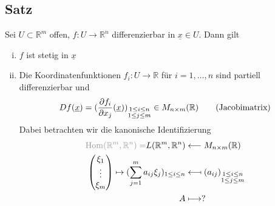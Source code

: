 \subsection[Satz: Differenzierbar impliziert stetig und partiell differenzierbare Koordinatenfunktionen]{Satz} %
\label{sub:74}
Sei $U \subset \mathds{R}^m$ offen, $f : U \to \mathds{R}^n$ differenzierbar in $\underline{x} \in U$. Dann gilt 
\begin{enumerate}[(i)]
	\item $f$ ist stetig in $\underline{x} $
	\item Die Koordinatenfunktionen $f_i : U \to \mathds{R}$ für $i= 1, \ldots , n$ sind partiell differenzierbar und 
	\[
		D f(\underline{x} ) = (\frac{\partial f_i }{\partial x_j} ( \underline{x} ) )_{\substack{1 \le i \le n \\ 1 \le j \le m}} \in M_{n \times m}(\mathbb{R})
		\tag{Jacobimatrix}
	\]
	Dabei betrachten wir die kanonische Identifizierung 
	\begin{align*}
		{\color{light_gray}\Hom(\mathds{R}^m, \mathds{R}^n)=} L(\mathds{R}^m, \mathds{R}^n) &\longleftarrow M_{n \times m} (\mathds{R}) \\
		\begin{pmatrix}
			\xi_1 \\ \vdots \\ \xi_m
		\end{pmatrix} \mapsto \enbrace{\sum_{j=1}^{m} a_{ij} \xi_j}_{1 \le i \le n } &\longmapsfrom (a_{ij})_{\substack{1 \le i \le n \\ 1 \le j \le m}} \\
		A &\longmapsto ?
	\end{align*}
\end{enumerate}

